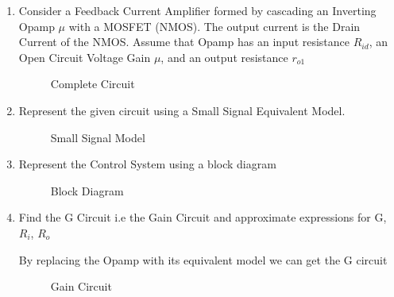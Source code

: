 \begin{enumerate}[label=\thesubsection.\arabic*.,ref=\thesubsection.\theenumi]
\item
Consider a Feedback Current Amplifier formed by cascading an Inverting Opamp $\mu$ with a MOSFET (NMOS).
The output current is the Drain Current of the NMOS.
Assume that Opamp has an input resistance $R_{id}$, an Open Circuit Voltage Gain $\mu$, and an output resistance $r_{o1}$

\begin{figure}[!ht]
	\begin{center}
		\resizebox{\columnwidth}{!}{}
	\end{center}
\caption{Complete Circuit}
\label{fig:Complete_Circuit}
\end{figure}

\item
Represent the given circuit using a Small Signal Equivalent Model.

\solution
\begin{figure}[!ht]
	\begin{center}
		\resizebox{\columnwidth}{!}{}
	\end{center}
\caption{Small Signal Model}
\label{fig:Small_Signal_Model}
\end{figure}

\item
Represent the Control System using a block diagram

\solution
\begin{figure}[!ht]
	\begin{center}
			\resizebox{\columnwidth}{!}{}
	\end{center}
\caption{Block Diagram}
\label{fig:Block_Diagram}
\end{figure}

\item
Find the G Circuit i.e the Gain Circuit and approximate expressions for G, $R_{i}$, $R_{o}$

\solution
By replacing the Opamp with its equivalent model we can get the G circuit

\begin{figure}[!ht]
	\begin{center}
		
		\resizebox{\columnwidth}{!}{}
	\end{center}
\caption{Gain Circuit}
\label{fig:Complete_Circuit}
\end{figure}



\end{enumerate}
